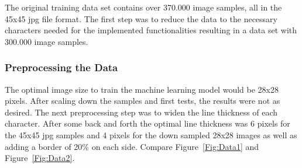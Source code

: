 \documentclass[@CLASSOPTIONS@]{tumarticle}
\begin{document}
The original training data set contains over 370.000 image samples, all in the 45x45 jpg file format.
The first step was to reduce the data to the necessary characters needed for the
implemented functionalities resulting in a data set with 300.000 image samples.

\subsubsection{Preprocessing the Data}

The optimal image size to train the machine learning model would be 28x28 pixels.
After scaling down the samples and first tests, the results were not as desired.
The next preprocessing step was to widen the line thickness of each character.
After some back and forth the optimal line thickness was 6 pixels for the 45x45 jpg samples and
4 pixels for the down sampled 28x28 images as well as adding a border of 20\% on each side.
Compare Figure~\ref{Fig:Data1} and Figure~\ref{Fig:Data2}.
\end{document}
